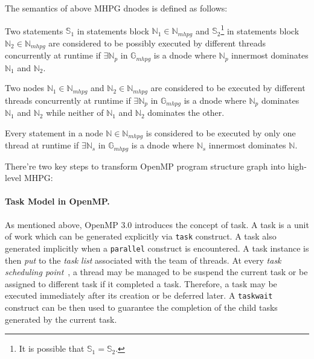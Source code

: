 The semantics of above MHPG dnodes is defined as follows:
\begin{mydef}
Two statements $\mathbb{S}_1$ in statements block $\mathbb{N}_1 \in \mathbb{N}_{mhpg}$ and $\mathbb{S}_2$\footnote{It is possible that $\mathbb{S}_1 = \mathbb{S}_2$.} in statements block $\mathbb{N}_2 \in \mathbb{N}_{mhpg}$ are considered to be possibly executed by different threads concurrently at runtime if $\exists\mathbb{N}_{p}$ in $\mathbb{G}_{mhpg}$ is a  dnode where $\mathbb{N}_{p}$ innermost dominates $\mathbb{N}_1$ and $\mathbb{N}_2$.
\end{mydef}

\begin{mydef}\label{l:second-semantics-of-mhpg-parallel-node}
Two nodes $\mathbb{N}_1 \in \mathbb{N}_{mhpg}$ and $\mathbb{N}_2 \in \mathbb{N}_{mhpg}$ are considered to be executed by different threads concurrently at runtime if $\exists\mathbb{N}_{p}$ in $\mathbb{G}_{mhpg}$ is a  dnode where $\mathbb{N}_{p}$ dominates $\mathbb{N}_1$ and $\mathbb{N}_2$ while neither of $\mathbb{N}_1$ and $\mathbb{N}_2$ dominates the other.
\end{mydef}

\begin{mydef}
Every statement in a node $\mathbb{N} \in \mathbb{N}_{mhpg}$ is considered to be executed by only one thread at runtime if $\exists\mathbb{N}_{s}$ in $\mathbb{G}_{mhpg}$ is a  dnode where $\mathbb{N}_{s}$ innermost dominates $\mathbb{N}$.
\end{mydef}

There're two key steps to transform OpenMP program structure graph into high-level MHPG:

\paragraph{Task Model in OpenMP.}
As mentioned above, OpenMP 3.0 introduces the concept of task. A task is a unit of work which can be generated explicitly via \texttt{task} construct. A task also generated implicitly when a \texttt{parallel} construct is encountered. A task instance is then \textit{put} to the \textit{task list} associated with the team of threads. At every \textit{task scheduling point}~\cite{OpenMP30Spec}, a thread may be managed to be suspend the current task or be assigned to different task if it completed a task. Therefore, a task may be executed immediately after its creation or be deferred later. A \texttt{taskwait} construct can be then used to guarantee the completion of the child tasks generated by the current task.

